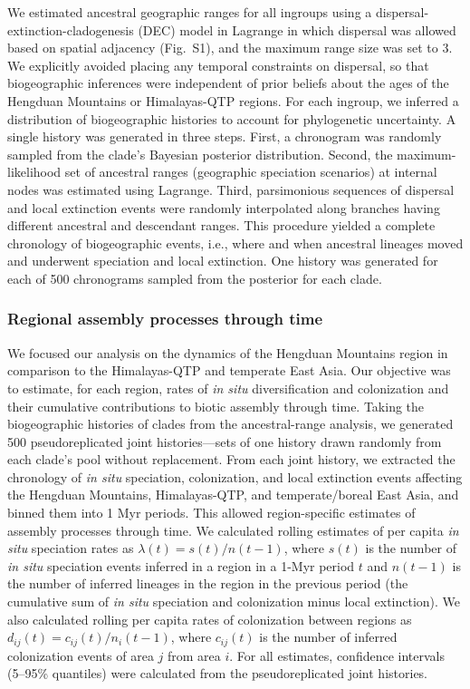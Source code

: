 We estimated ancestral geographic ranges for all ingroups using a
dispersal-extinction-cladogenesis (DEC) model in Lagrange
\citep{Ree2005,Ree2008} in which dispersal was allowed based on
spatial adjacency (Fig.~S1), and the maximum range size was set to
3. We explicitly avoided placing any temporal constraints on
dispersal, so that biogeographic inferences were independent of prior
beliefs about the ages of the Hengduan Mountains or Himalayas-QTP
regions. For each ingroup, we inferred a distribution of biogeographic
histories to account for phylogenetic uncertainty. A single history
was generated in three steps. First, a chronogram was randomly sampled
from the clade's Bayesian posterior distribution. Second, the
maximum-likelihood set of ancestral ranges (geographic speciation
scenarios) at internal nodes was estimated using Lagrange. Third,
parsimonious sequences of dispersal and local extinction events were
randomly interpolated along branches having different ancestral and
descendant ranges. This procedure yielded a complete chronology of
biogeographic events, i.e., where and when ancestral lineages moved
and underwent speciation and local extinction. One history was
generated for each of 500 chronograms sampled from the posterior for
each
clade.%

\subsubsection*{Regional assembly processes through time}

We focused our analysis on the dynamics of the Hengduan Mountains
region in comparison to the Himalayas-QTP and temperate East Asia. Our
objective was to estimate, for each region, rates of \textit{in situ}
diversification and colonization and their cumulative contributions to
biotic assembly through time. Taking the biogeographic histories of
clades from the ancestral-range analysis, we generated 500
pseudoreplicated joint histories---sets of one history drawn randomly
from each clade's pool without replacement. From each joint history,
we extracted the chronology of \textit{in situ} speciation,
colonization, and local extinction events affecting the Hengduan
Mountains, Himalayas-QTP, and temperate/boreal East Asia, and binned
them into 1 Myr periods. This allowed region-specific estimates of
assembly processes through time. We calculated rolling estimates of
per capita \textit{in situ} speciation rates as
$\lambda(t) = s(t)/n(t-1)$, where $s(t)$ is the number of \textit{in
  situ} speciation events inferred in a region in a 1-Myr period $t$
and $n(t-1)$ is the number of inferred lineages in the region in the
previous period (the cumulative sum of \textit{in situ} speciation and
colonization minus local extinction). We also calculated rolling per
capita rates of colonization between regions as
$d_{ij}(t) = c_{ij}(t)/n_i(t-1)$, where $c_{ij}(t)$ is the number of
inferred colonization events of area $j$ from area $i$. For all
estimates, confidence intervals (5--95\% quantiles) were calculated
from the pseudoreplicated joint
histories.%

